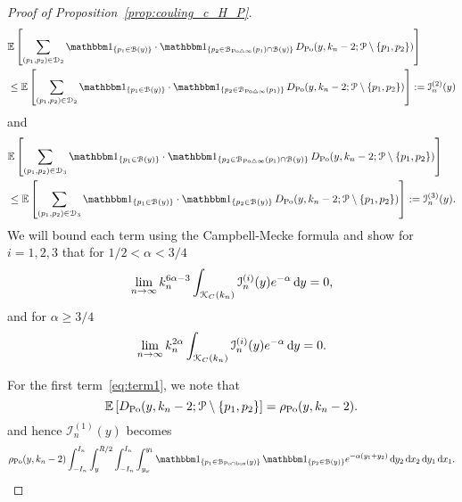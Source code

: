\begin{proof}[Proof of Proposition~\ref{prop:couling_c_H_P}]
\begin{equation} \label{eq:term2}
\begin{split}
	&\Exp{\sum_{(p_1, p_2)\in \dom{2}} \ind{p_1 \in \BallHyp{y}} \cdot \ind{p_2 \in \BallSym{p_1}\cap \BallHyp{y}} 
		\, D_{\Po} (y,k_n-2;\Pcal \setminus \{p_1,p_2\})} \\
	&\le \Exp{\sum_{(p_1, p_2)\in \dom{2}} \ind{p_1 \in \BallHyp{y}} \cdot \ind{p_2 \in \BallSym{p_1}} 
		\, D_{\Po} (y,k_n-2;\Pcal \setminus \{p_1,p_2\})} := \mathcal{I}_n^{(2)}(y)
\end{split}
\end{equation}
and 
\begin{equation}\label{eq:term3}
\begin{split}
	&\Exp{\sum_{(p_1, p_2)\in \dom{3}} \ind{p_1 \in \BallHyp{y}} \cdot \ind{p_2 \in \BallSym{p_1}\cap \BallHyp{y}} 
		\, D_{\Po} (y,k_n-2;\Pcal \setminus \{p_1,p_2\})} \\
	&\le \Exp{\sum_{(p_1, p_2)\in \dom{3}} \ind{p_1 \in \BallHyp{y}} \cdot \ind{p_2 \in \BallHyp{y}} 
		\, D_{\Po} (y,k_n-2;\Pcal \setminus \{p_1,p_2\})} := \mathcal{I}_n^{(3)}(y).
\end{split}
\end{equation}
We will bound each term using the Campbell-Mecke formula and show for $i = 1,2,3$ that for $1/2 < \alpha < 3/4$
\begin{equation}
	\lim_{n \to \infty} k_n^{6\alpha -3} 
		\int_{{\mathcal K}_{C}(k_n)} \mathcal{I}_n^{(i)}(y) e^{-\alpha} \operatorname{\mathrm{d}\hspace{-2pt}} y = 0,
\end{equation}
and for $\alpha \ge 3/4$
\begin{equation}
	\lim_{n \to \infty} k_n^{2\alpha}
		\int_{{\mathcal K}_{C}(k_n)} \mathcal{I}_n^{(i)}(y) e^{-\alpha} \operatorname{\mathrm{d}\hspace{-2pt}} y = 0.
\end{equation}

For the first term~\eqref{eq:term1}, we note that
\[ 
\mathbb{E}\left[D_{{\mathrm{Po}}}(y, k_n-2;{\mathcal P} \setminus \{p_1, p_2\}\right] =\rho_{{\mathrm{Po}}}(y,k_n-2).
\] 
and hence $\mathcal{I}_n^{(1)}(y)$ becomes
\begin{equation} \label{eq:1sum-expansion} 
\begin{split}
	\rho_{\Po}(y,k_n-2) \int_{-I_n}^{I_n} \int_y^{R/2}\int_{-I_n}^{I_n} \int_{y_\omega}^{y_1}
  	\ind{p_1 \in \BallInter{y}} \, \ind{p_2 \in \BallHyp{y}} 
  	e^{-\alpha (y_1 + y_2)} \dd y_2 \dd x_2 \dd y_1 \dd x_1.
\end{split}
\end{equation}


\end{proof}
